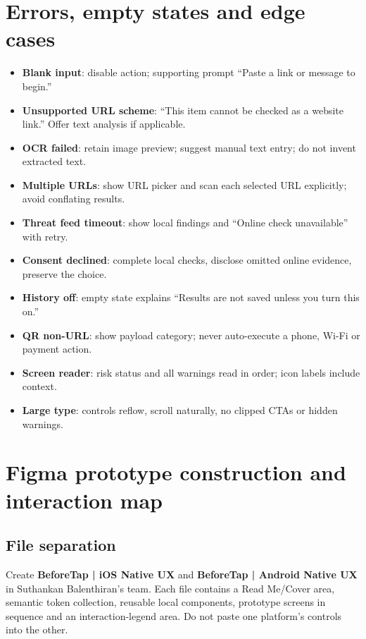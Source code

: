 \documentclass[10pt,a4paper]{article}
\begin{document}
\section{Errors, empty states and edge cases}
\begin{itemize}
\item \textbf{Blank input}: disable action; supporting prompt ``Paste a link or message to begin.''
\item \textbf{Unsupported URL scheme}: ``This item cannot be checked as a website link.'' Offer text analysis if applicable.
\item \textbf{OCR failed}: retain image preview; suggest manual text entry; do not invent extracted text.
\item \textbf{Multiple URLs}: show URL picker and scan each selected URL explicitly; avoid conflating results.
\item \textbf{Threat feed timeout}: show local findings and ``Online check unavailable'' with retry.
\item \textbf{Consent declined}: complete local checks, disclose omitted online evidence, preserve the choice.
\item \textbf{History off}: empty state explains ``Results are not saved unless you turn this on.''
\item \textbf{QR non-URL}: show payload category; never auto-execute a phone, Wi-Fi or payment action.
\item \textbf{Screen reader}: risk status and all warnings read in order; icon labels include context.
\item \textbf{Large type}: controls reflow, scroll naturally, no clipped CTAs or hidden warnings.
\end{itemize}

\section{Figma prototype construction and interaction map}
\subsection{File separation}
Create \textbf{BeforeTap | iOS Native UX} and \textbf{BeforeTap | Android Native UX} in Suthankan Balenthiran's team. Each file contains a Read Me/Cover area, semantic token collection, reusable local components, prototype screens in sequence and an interaction-legend area. Do not paste one platform's controls into the other.
\end{document}
